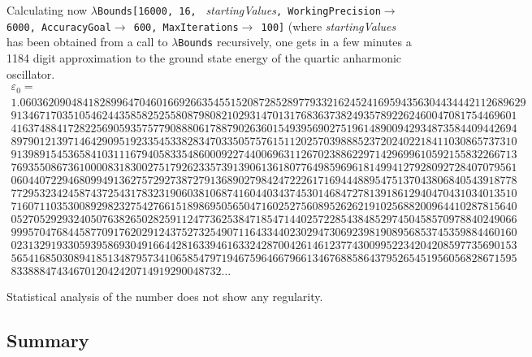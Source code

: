 \documentclass{article}
\begin{document}
Calculating now \texttt{$\lambda$Bounds[16000, 16, }\textit{{\itshape
startingValues}}\texttt{, WorkingPrecision$ \rightarrow\ \ $6000,
AccuracyGoal$ \rightarrow\ \ $600, MaxIterations$ \rightarrow\ \ $100]}
(where \textit{startingValues} has been obtained from a call to
\texttt{$\lambda$Bounds} recursively, one gets in a few minutes
a 1184 digit approximation to the ground state energy of the quartic
anharmonic oscillator.  
\begin{multline*}
\varepsilon _{0}=\\
1.06036209048418289964704601669266354551520872852897793321624524169594356304434442112689629\\
91346717035105462443585825255808798082102931470131768363738249357892262460047081754469601\\
41637488417282256905935757790888061788790263601549395690275196148900942934873584409442694\\
89790121397146429095192335453382834703350575761511202570398885237202402218411030865737310\\
91398915453658410311167940583354860009227440069631126702388622971429699610592155832266713\\
76935508673610000831830027517926233573913906136180776498596961814994127928092728407079561\\
06044072294680994913627572927387279136890279842472226171694448895475137043806840543918778\\
77295323424587437254317832319060381068741604403437453014684727813918612940470431034013510\\
71607110353008929823275427661518986950565047160252756089526262191025688200964410287815640\\
05270529293240507638265028259112477362538471854714402572285438485297450458570978840249066\\
99957047684458770917620291243752732549071164334402302947306923981908956853745359884460160\\
02313291933059395869304916644281633946163324287004261461237743009952234204208597735690153\\
56541685030894185134879573410658547971946759646679661346768858643795265451956056828671595\\
8338884743467012042420714919290048732\ldots 
\end{multline*}

Statistical analysis of the number does not show any regularity.
\subsection{Summary}
\end{document}
